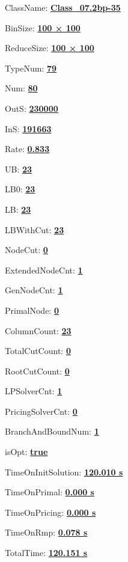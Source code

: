 \documentclass[11pt]{article}
\begin{document}
\pagestyle{empty}


ClassName: \underline{\textbf{Class_07.2bp-35}}
\par
BinSize: \underline{\textbf{100 × 100}}
\par
ReduceSize: \underline{\textbf{100 × 100}}
\par
TypeNum: \underline{\textbf{79}}
\par
Num: \underline{\textbf{80}}
\par
OutS: \underline{\textbf{230000}}
\par
InS: \underline{\textbf{191663}}
\par
Rate: \underline{\textbf{0.833}}
\par
UB: \underline{\textbf{23}}
\par
LB0: \underline{\textbf{23}}
\par
LB: \underline{\textbf{23}}
\par
LBWithCut: \underline{\textbf{23}}
\par
NodeCut: \underline{\textbf{0}}
\par
ExtendedNodeCnt: \underline{\textbf{1}}
\par
GenNodeCnt: \underline{\textbf{1}}
\par
PrimalNode: \underline{\textbf{0}}
\par
ColumnCount: \underline{\textbf{23}}
\par
TotalCutCount: \underline{\textbf{0}}
\par
RootCutCount: \underline{\textbf{0}}
\par
LPSolverCnt: \underline{\textbf{1}}
\par
PricingSolverCnt: \underline{\textbf{0}}
\par
BranchAndBoundNum: \underline{\textbf{1}}
\par
isOpt: \underline{\textbf{true}}
\par
TimeOnInitSolution: \underline{\textbf{120.010 s}}
\par
TimeOnPrimal: \underline{\textbf{0.000 s}}
\par
TimeOnPricing: \underline{\textbf{0.000 s}}
\par
TimeOnRmp: \underline{\textbf{0.078 s}}
\par
TotalTime: \underline{\textbf{120.151 s}}
\par
\newpage


\end{document}
